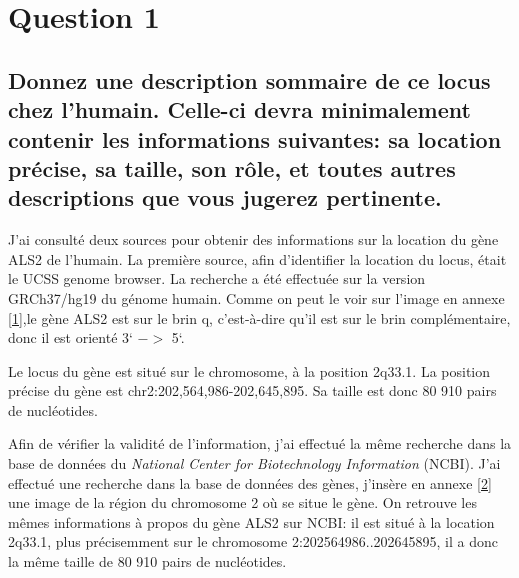 \documentclass[11pt]{article} %
\begin{document}

\tableofcontents %

\newpage %

\section{Question 1} %

\subsection[Description du gène ALS2]{Donnez une description sommaire de ce locus chez l'humain. Celle-ci devra 
minimalement contenir les informations suivantes: sa location précise, sa taille, son rôle,
et toutes autres descriptions que vous jugerez pertinente.}

J'ai consulté deux sources pour obtenir des informations sur la location du gène ALS2 de l'humain. La première source,
afin d'identifier la location du locus, était le UCSS genome browser. La recherche a été effectuée sur la version GRCh37/hg19
du génome humain. Comme on peut le voir sur l'image en annexe \ref{1},le
gène ALS2 est sur le brin q, c'est-à-dire qu'il est sur le brin complémentaire, donc il est orienté 3` $->$ 5`.

Le locus du gène est situé sur le chromosome, à la position 2q33.1. La position précise du gène est chr2:202,564,986-202,645,895.
Sa taille est donc 80 910 pairs de nucléotides. 

Afin de vérifier la validité de l'information, j'ai effectué la même recherche dans la base de données du
\emph{National Center for Biotechnology Information} (NCBI). J'ai effectué une recherche dans la base de données des gènes,
j'insère en annexe \ref{2}  une image de la région du chromosome 2 où se situe le gène. On retrouve les mêmes informations
à propos du gène ALS2 sur NCBI: il est situé à la location 2q33.1, plus précisemment sur le chromosome 2:202564986..202645895, 
il a donc la même taille de 80 910 pairs de nucléotides.
\end{document}
